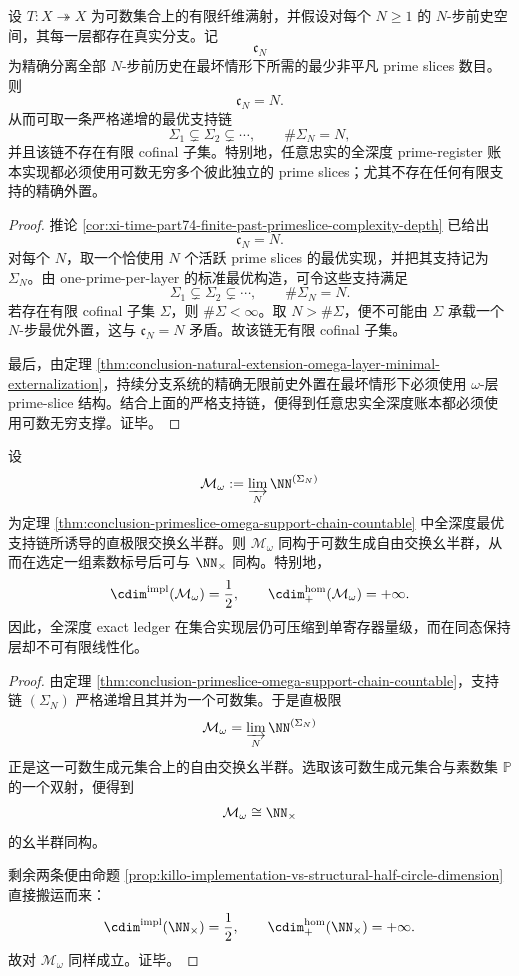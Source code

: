 \begin{theorem}\label{thm:conclusion-primeslice-omega-support-chain-countable}
设 \(T:X\twoheadrightarrow X\) 为可数集合上的有限纤维满射，并假设对每个 \(N\ge 1\) 的 \(N\)-步前史空间，其每一层都存在真实分支。记
\[
\mathfrak c_N
\]
为精确分离全部 \(N\)-步前历史在最坏情形下所需的最少非平凡 prime slices 数目。则
\[
\mathfrak c_N=N.
\]
从而可取一条严格递增的最优支持链
\[
\Sigma_1\subsetneq \Sigma_2\subsetneq \cdots,
\qquad
\#\Sigma_N=N,
\]
并且该链不存在有限 cofinal 子集。特别地，任意忠实的全深度 prime-register 账本实现都必须使用可数无穷多个彼此独立的 prime slices；尤其不存在任何有限支持的精确外置。
\end{theorem}
\begin{proof}
推论 \ref{cor:xi-time-part74-finite-past-primeslice-complexity-depth} 已给出
\[
\mathfrak c_N=N.
\]
对每个 \(N\)，取一个恰使用 \(N\) 个活跃 prime slices 的最优实现，并把其支持记为 \(\Sigma_N\)。由 one-prime-per-layer 的标准最优构造，可令这些支持满足
\[
\Sigma_1\subsetneq \Sigma_2\subsetneq \cdots,
\qquad
\#\Sigma_N=N.
\]
若存在有限 cofinal 子集 \(\Sigma\)，则 \(\#\Sigma<\infty\)。取 \(N>\#\Sigma\)，便不可能由 \(\Sigma\) 承载一个 \(N\)-步最优外置，这与 \(\mathfrak c_N=N\) 矛盾。故该链无有限 cofinal 子集。

最后，由定理 \ref{thm:conclusion-natural-extension-omega-layer-minimal-externalization}，持续分支系统的精确无限前史外置在最坏情形下必须使用 \(\omega\)-层 prime-slice 结构。结合上面的严格支持链，便得到任意忠实全深度账本都必须使用可数无穷支撑。证毕。
\end{proof}

\begin{proposition}\label{prop:conclusion-primeslice-omega-support-impl-structure-split}
设
\[
\mathcal M_\omega:=\varinjlim_{N}\NN^{(\Sigma_N)}
\]
为定理 \ref{thm:conclusion-primeslice-omega-support-chain-countable} 中全深度最优支持链所诱导的直极限交换幺半群。则 \(\mathcal M_\omega\) 同构于可数生成自由交换幺半群，从而在选定一组素数标号后可与 \(\NN_{\times}\) 同构。特别地，
\[
\cdim^{\mathrm{impl}}(\mathcal M_\omega)=\frac12,
\qquad
\cdim_{+}^{\mathrm{hom}}(\mathcal M_\omega)=+\infty.
\]
因此，全深度 exact ledger 在集合实现层仍可压缩到单寄存器量级，而在同态保持层却不可有限线性化。
\end{proposition}
\begin{proof}
由定理 \ref{thm:conclusion-primeslice-omega-support-chain-countable}，支持链 \((\Sigma_N)\) 严格递增且其并为一个可数集。于是直极限
\[
\mathcal M_\omega=\varinjlim_{N}\NN^{(\Sigma_N)}
\]
正是这一可数生成元集合上的自由交换幺半群。选取该可数生成元集合与素数集 \(\mathbb P\) 的一个双射，便得到
\[
\mathcal M_\omega\cong \NN_{\times}
\]
的幺半群同构。

剩余两条便由命题 \ref{prop:killo-implementation-vs-structural-half-circle-dimension} 直接搬运而来：
\[
\cdim^{\mathrm{impl}}(\NN_{\times})=\frac12,
\qquad
\cdim_{+}^{\mathrm{hom}}(\NN_{\times})=+\infty.
\]
故对 \(\mathcal M_\omega\) 同样成立。证毕。
\end{proof}

